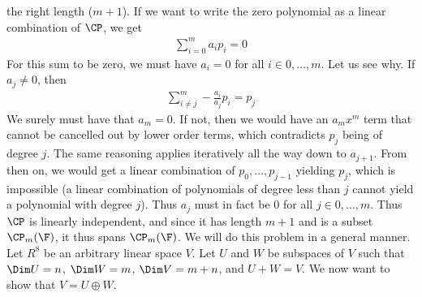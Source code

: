 \documentclass{book}
\begin{document}
\begin{enumerate}[label=\arabic*)]
      the right length ($m + 1$). If we want to write the zero polynomial as a linear combination of $\CP$, we get
      \begin{align*}
        \sum_{i = 0}^{m}a_ip_i = 0
      \end{align*}
      For this sum to be zero, we must have $a_i = 0$ for all $i \in 0, \dots, m$. Let us see why. If $a_j \neq 0$, then 
      \begin{align*}
        \sum_{i \neq j}^{m}-\frac{a_i}{a_j}p_i = p_j
      \end{align*}
      We surely must have that $a_m = 0$. If not, then we would have an $a_mx^m$ term that cannot be cancelled out by lower order terms, which contradicts $p_j$ being of
      degree $j$. The same reasoning applies iteratively all the way down to $a_{j + 1}$. From then on, we would get a linear combination of $p_0, \dots, p_{j - 1}$ yielding
      $p_j$, which is impossible (a linear combination of polynomials of degree less than $j$ cannot yield a polynomial with degree $j$). Thus $a_j$ must in fact be $0$ for
      all $j \in 0, \dots, m$. Thus $\CP$ is linearly independent, and since it has length $m + 1$ and is a subset $\CP_m(\F)$, it thus spans $\CP_m(\F)$.
    \ii
      We will do this problem in a general manner. Let $R^8$ be an arbitrary linear space $V$. Let $U$ and $W$ be subspaces of $V$ such that $\Dim U = n$, $\Dim W = m$, $\Dim
      V = m + n$, and $U + W = V$. We now want to show that $V = U \oplus W$.  


\end{enumerate}
\end{document}
